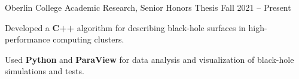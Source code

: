 \begin{entry}{Oberlin College}
	\entryItem
		{Academic Research, Senior Honors Thesis}
		{Fall 2021 -- Present}
		
		\begin{items}
			\item Developed a \textbf{C++} algorithm for describing black-hole surfaces in high-performance computing clusters.
			\item Used \textbf{Python} and \textbf{ParaView} for data analysis and visualization of black-hole simulations and tests.
		\end{items}
\end{entry}
